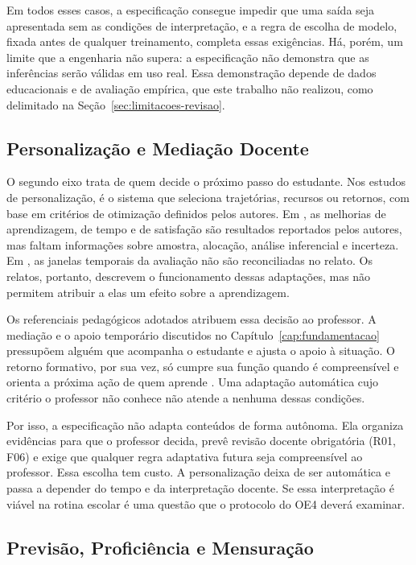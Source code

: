 Em todos esses casos, a especificação consegue impedir que uma saída seja apresentada sem as condições de interpretação, e a regra de escolha de modelo, fixada antes de qualquer treinamento, completa essas exigências. Há, porém, um limite que a engenharia não supera: a especificação não demonstra que as inferências serão válidas em uso real. Essa demonstração depende de dados educacionais e de avaliação empírica, que este trabalho não realizou, como delimitado na Seção~\ref{sec:limitacoes-revisao}.

\subsection{Personalização e Mediação Docente}

O segundo eixo trata de quem decide o próximo passo do estudante. Nos estudos de personalização, é o sistema que seleciona trajetórias, recursos ou retornos, com base em critérios de otimização definidos pelos autores. Em , as melhorias de aprendizagem, de tempo e de satisfação são resultados reportados pelos autores, mas faltam informações sobre amostra, alocação, análise inferencial e incerteza. Em , as janelas temporais da avaliação não são reconciliadas no relato. Os relatos, portanto, descrevem o funcionamento dessas adaptações, mas não permitem atribuir a elas um efeito sobre a aprendizagem.

Os referenciais pedagógicos adotados atribuem essa decisão ao professor. A mediação e o apoio temporário discutidos no Capítulo~\ref{cap:fundamentacao} pressupõem alguém que acompanha o estudante e ajusta o apoio à situação. O retorno formativo, por sua vez, só cumpre sua função quando é compreensível e orienta a próxima ação de quem aprende \cite{HattieTimperley2007}. Uma adaptação automática cujo critério o professor não conhece não atende a nenhuma dessas condições.

Por isso, a especificação não adapta conteúdos de forma autônoma. Ela organiza evidências para que o professor decida, prevê revisão docente obrigatória (R01, F06) e exige que qualquer regra adaptativa futura seja compreensível ao professor. Essa escolha tem custo. A personalização deixa de ser automática e passa a depender do tempo e da interpretação docente. Se essa interpretação é viável na rotina escolar é uma questão que o protocolo do OE4 deverá examinar.

\subsection{Previsão, Proficiência e Mensuração}

